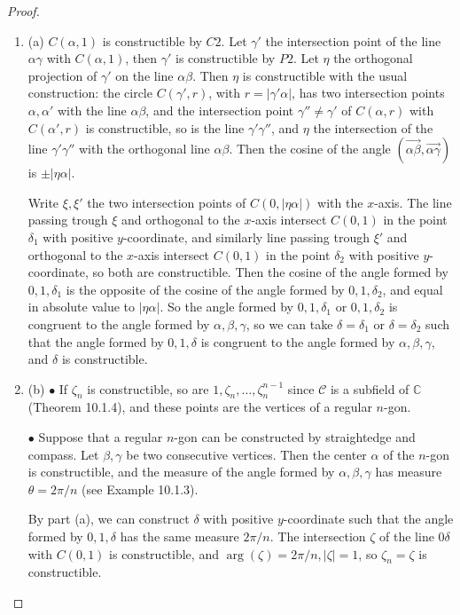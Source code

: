 \documentclass[11pt,a4paper]{article}
\newcommand{\be} {\begin{enumerate}}
\newcommand{\ee} {\end{enumerate}}
\newcommand{\C}{\mathbb{C}}
\begin{document}
\begin{proof}
\be
\item[(a)] $C(\alpha,1)$ is constructible by $C2$. Let $\gamma'$ the intersection point of the line $\alpha \gamma$ with $C(\alpha,1)$, then $\gamma'$ is constructible by $P2$. Let $\eta$ the orthogonal projection of $\gamma'$ on the line $\alpha \beta$. Then $\eta$ is constructible with the usual construction: the circle $C(\gamma',r)$, with $r=  |\gamma' \alpha|$,  has two intersection points $\alpha,\alpha'$ with the line $\alpha \beta$, and the intersection point $\gamma'' \ne \gamma'$ of $C(\alpha,r)$ with $C(\alpha',r)$ is constructible, so is the line $\gamma' \gamma''$, and $\eta$ the intersection of the line $\gamma' \gamma''$ with the orthogonal line $\alpha \beta$. Then the cosine of the angle $(\overrightarrow{\alpha \beta},\overrightarrow{\alpha \gamma})$ is $\pm | \eta \alpha| $.

Write $\xi, \xi'$ the two intersection points of $C(0,| \eta \alpha|)$ with the $x$-axis. The  line passing trough $\xi$ and orthogonal to the $x$-axis intersect $C(0,1)$ in the point $\delta_1 $ with positive $y$-coordinate, and similarly  line passing trough $\xi'$ and orthogonal to the $x$-axis intersect $C(0,1)$ in the point $\delta_2 $ with positive $y$-coordinate, so both are constructible. Then the cosine of the angle formed by $0,1,\delta_1$ is the opposite of the cosine of the angle formed by $0,1,\delta_2$, and equal in absolute value to $ |\eta \alpha|$. So the angle formed by  $0,1,\delta_1$ or $0,1,\delta_2$ is congruent to the angle formed by $\alpha,\beta,\gamma$, so we can take $\delta = \delta_1$ or $\delta = \delta_2$ such that the angle formed by  $0,1,\delta$ is congruent to the angle formed by $\alpha,\beta,\gamma$, and $\delta$ is constructible.

\item[(b)] $\bullet$ If $\zeta_n$ is constructible, so are $1,\zeta_n,\ldots, \zeta_n^{n-1}$ since $\mathscr{C}$ is a subfield of $\C$ (Theorem 10.1.4), and these points are the vertices of a regular $n$-gon.

$\bullet$ Suppose that a regular $n$-gon can be constructed by straightedge and compass. Let $\beta, \gamma$ be two consecutive vertices. Then the center $\alpha$ of the $n$-gon is constructible, and the measure of the angle formed by $\alpha, \beta,\gamma$ has measure $\theta = 2\pi/n$ (see Example 10.1.3).

By part (a), we can construct $\delta$ with positive $y$-coordinate such that the angle formed by $0,1,\delta$ has the same measure $2\pi/n$. The intersection $\zeta$ of the line $0\delta$ with $C(0,1)$ is constructible, and $\arg(\zeta) = 2\pi/n, |\zeta| = 1$, so $\zeta_n = \zeta$ is constructible.
\ee
\end{proof}
\end{document}
